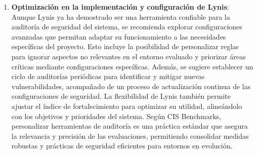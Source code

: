 \begin{enumerate}
    \item \textbf{Optimización en la implementación y configuración de Lynis}: Aunque Lynis ya ha demostrado ser una herramienta confiable para la auditoría de seguridad del sistema, se recomienda explorar configuraciones avanzadas que permitan adaptar su funcionamiento a las necesidades específicas del proyecto. Esto incluye la posibilidad de personalizar reglas para ignorar aspectos no relevantes en el entorno evaluado y priorizar áreas críticas mediante configuraciones específicas. Además, se sugiere establecer un ciclo de auditorías periódicas para identificar y mitigar nuevas vulnerabilidades, acompañado de un proceso de actualización continua de las configuraciones de seguridad. La flexibilidad de Lynis también permite ajustar el índice de fortalecimiento para optimizar su utilidad, alineándolo con los objetivos y prioridades del sistema. Según CIS Benchmarks, personalizar herramientas de auditoría es una práctica estándar que asegura la relevancia y precisión de las evaluaciones, permitiendo consolidar medidas robustas y prácticas de seguridad eficientes para entornos en evolución.
    
\end{enumerate}

